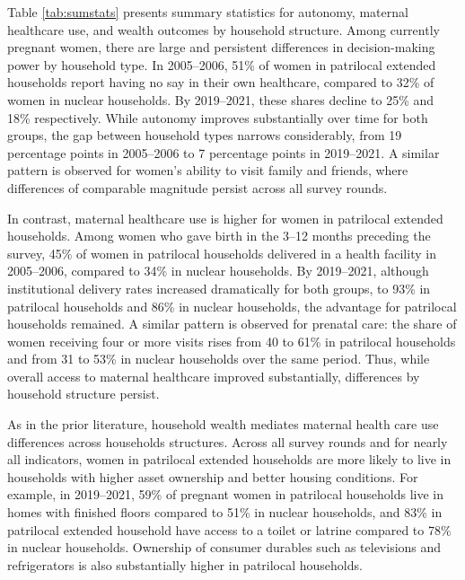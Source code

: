 \documentclass[12pt]{article}
\begin{document}
Table \ref{tab:sumstats} presents summary statistics for autonomy, maternal healthcare use, and wealth outcomes by household structure. Among currently pregnant women, there are large and persistent differences in decision-making power by household type. In 2005–2006, 51\% of women in patrilocal extended households report having no say in their own healthcare, compared to 32\% of women in nuclear households. By 2019–2021, these shares decline to 25\% and 18\% respectively. While autonomy improves substantially over time for both groups, the gap between household types narrows considerably, from 19 percentage points in 2005–2006 to 7 percentage points in 2019–2021. A similar pattern is observed for women’s ability to visit family and friends, where differences of comparable magnitude persist across all survey rounds.

In contrast, maternal healthcare use is higher for women in patrilocal extended households. Among women who gave birth in the 3–12 months preceding the survey, 45\% of women in patrilocal households delivered in a health facility in 2005–2006, compared to 34\% in nuclear households. By 2019–2021, although institutional delivery rates increased dramatically for both groups, to 93\% in patrilocal households and 86\% in nuclear households, the advantage for patrilocal households remained. A similar pattern is observed for prenatal care: the share of women receiving four or more visits rises from 40 to 61\% in patrilocal households and from 31 to 53\% in nuclear households over the same period. Thus, while overall access to maternal healthcare improved substantially, differences by household structure persist.

As in the prior literature, household wealth mediates maternal health care use differences across households structures. Across all survey rounds and for nearly all indicators, women in patrilocal extended households are more likely to live in households with higher asset ownership and better housing conditions. For example, in 2019–2021, 59\% of pregnant women in patrilocal households live in homes with finished floors compared to 51\% in nuclear households, and 83\% in patrilocal extended household have access to a toilet or latrine compared to 78\% in nuclear households. Ownership of consumer durables such as televisions and refrigerators is also substantially higher in patrilocal households.
\end{document}
